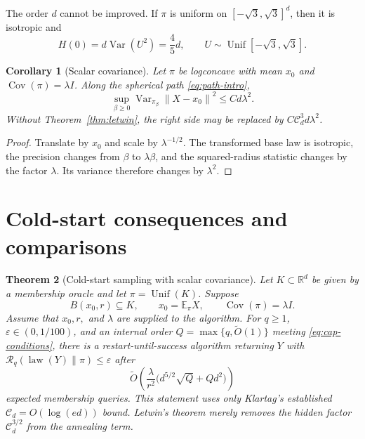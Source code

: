 \documentclass[11pt]{article}
\newtheorem{theorem}{Theorem}[section]
\newtheorem{corollary}[theorem]{Corollary}
\theoremstyle{remark}
\newcommand{\R}{\mathbb R}
\newcommand{\E}{\mathbb E}
\newcommand{\1}{\bm 1}
\newcommand{\eps}{\varepsilon}
\newcommand{\Cov}{\operatorname{Cov}}
\newcommand{\Var}{\operatorname{Var}}
\newcommand{\law}{\operatorname{law}}
\newcommand{\norm}[1]{\left\lVert #1\right\rVert}
\begin{document}
The order $d$ cannot be improved.  If $\pi$ is uniform on
$[-\sqrt3,\sqrt3]^d$, then it is isotropic and
\[
  H(0)=d\Var(U^2)=\frac45d,
  \qquad U\sim\operatorname{Unif}[-\sqrt3,\sqrt3].
\]

\begin{corollary}[Scalar covariance]
\label{cor:scalar-heat}
Let $\pi$ be logconcave with mean $x_0$ and
$\Cov(\pi)=\lambda I$.  Along the spherical path
\eqref{eq:path-intro},
\begin{equation}\label{eq:scalar-heat}
  \sup_{\beta\geq0}
  \Var_{\pi_\beta}\norm{X-x_0}^2
  \leq C d\lambda^2.
\end{equation}
Without Theorem~\ref{thm:letwin}, the right side may be replaced by
$C\mathcal C_d^3d\lambda^2$.
\end{corollary}

\begin{proof}
Translate by $x_0$ and scale by $\lambda^{-1/2}$.  The transformed base
law is isotropic, the precision changes from $\beta$ to
$\lambda\beta$, and the squared-radius statistic changes by the factor
$\lambda$.  Its variance therefore changes by $\lambda^2$.
\end{proof}

\section{Cold-start consequences and comparisons}
\label{sec:consequences}

\begin{theorem}[Cold-start sampling with scalar covariance]
\label{thm:cold-main}
Let $K\subset\R^d$ be given by a membership oracle and let
$\pi=\operatorname{Unif}(K)$.  Suppose
\[
  B(x_0,r)\subseteq K,
  \qquad x_0=\E_\pi X,
  \qquad \Cov(\pi)=\lambda I.
\]
Assume that $x_0,r,$ and $\lambda$ are supplied to the algorithm.
For $q\geq1$, $\eps\in(0,1/100)$, and an internal order
$Q=\max\{q,\widetilde O(1)\}$ meeting
\eqref{eq:cap-conditions}, there is a restart-until-success algorithm
returning $Y$ with
$\mathcal R_q(\law(Y)\|\pi)\leq\eps$ after
\begin{equation}\label{eq:cold-main}
  \widetilde O\!\left(
    \frac{\lambda}{r^2}
      \bigl(d^{5/2}\sqrt Q+Qd^2\bigr)
  \right)
\end{equation}
expected membership queries.  This statement uses only Klartag's
established $\mathcal C_d=O(\log(ed))$ bound.  Letwin's theorem merely
removes the hidden factor $\mathcal C_d^{3/2}$ from the annealing term.
\end{theorem}
\end{document}
